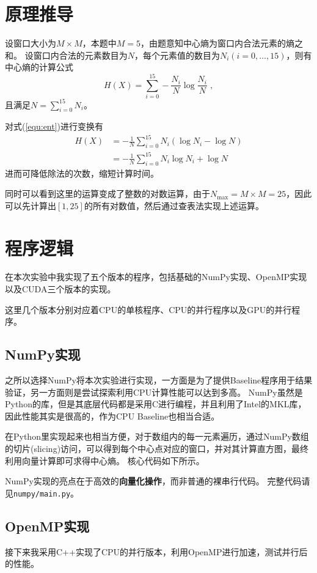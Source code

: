 \documentclass[logo,reportComp]{thesis}
\begin{document}
\section{原理推导}
设窗口大小为$M\times M$，本题中$M=5$，由题意知中心熵为窗口内合法元素的熵之和。
设窗口内合法的元素数目为$N$，每个元素值的数目为$N_i(i=0,\ldots,15)$，则有中心熵的计算公式
\begin{equation}
\label{equ:ent}
H(X)=\sum_{i=0}^{15}-\frac{N_i}{N}\log\frac{N_i}{N}\;,
\end{equation}
且满足$N=\sum_{i=0}^{15} N_i$。

对式(\ref{equ:ent})进行变换有
\begin{align}
H(X) &= -\frac{1}{N}\sum_{i=0}^{15}N_i(\log N_i-\log N)\\
&= -\frac{1}{N}\sum_{i=0}^{15}N_i\log N_i + \log N
\end{align}
进而可降低除法的次数，缩短计算时间。

同时可以看到这里的运算变成了整数的对数运算，由于$N_{\max}=M\times M=25$，因此可以先计算出$[1,25]$的所有对数值，然后通过查表法实现上述运算。

\section{程序逻辑}
在本次实验中我实现了五个版本的程序，包括基础的NumPy实现、OpenMP实现以及CUDA三个版本的实现。

这里几个版本分别对应着CPU的单核程序、CPU的并行程序以及GPU的并行程序。

\subsection{NumPy实现}
之所以选择NumPy将本次实验进行实现，一方面是为了提供Baseline程序用于结果验证，另一方面则是尝试探索利用CPU计算性能可以达到多高。
NumPy虽然是Python的库，但是其底层代码都是采用C进行编程，并且利用了Intel的MKL库，因此性能其实是很高的，作为CPU Baseline也相当合适。

在Python里实现起来也相当方便，对于数组内的每一元素遍历，通过NumPy数组的切片(slicing)访问，可以得到每个中心点对应的窗口，并对其计算直方图，最终利用向量计算即可求得中心熵。
核心代码如下所示。


NumPy实现的亮点在于高效的\textbf{向量化操作}，而非普通的裸串行代码。
完整代码请见\verb'numpy/main.py'。

\subsection{OpenMP实现}
接下来我采用C++实现了CPU的并行版本，利用OpenMP进行加速，测试并行后的性能。
\end{document}

